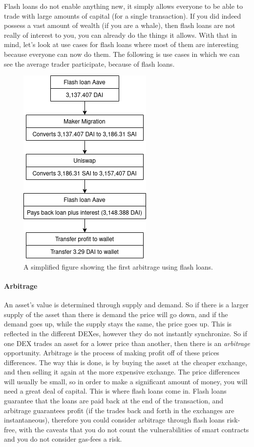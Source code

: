 Flash loans do not enable anything new, it simply allows everyone to be able
to trade with large amounts of capital (for a single transaction). If you did
indeed possess a vast amount of wealth (if you are a whale), then flash loans
are not really of interest to you, you can already do the things it allows. With
that in mind, let's look at use cases for flash loans where most of them are
interesting because everyone can now do them. The following is use cases in
which we can see the average trader participate, because of flash
loans\cite{attack}.

\begin{figure}
  \centering
  \includegraphics[width=.2\textwidth]{assests/Flash-loans-18-jan}
  \caption{A simplified figure showing the first arbitrage using flash loans.}
  \label{fig:firstArb}
\end{figure}
\paragraph{Arbitrage}
An asset's value is determined through supply and demand. So if there is a larger
supply of the asset than there is demand the price will go down, and if the
demand goes up, while the supply stays the same, the price goes up. This is
reflected in the different DEXes, however they do not instantly synchronize. So
if one DEX trades an asset for a lower price than another, then there is
an \textit{arbitrage} opportunity. Arbitrage is the process of making profit off
of these prices differences. The way this is done, is by buying the asset at the
cheaper exchange, and then selling it again at the more expensive exchange. The
price differences will usually be small, so in order to make a significant
amount of money, you will need a great deal of capital. This is where flash
loans come in. Flash loans guarantee that the loans are paid back at the end of
the transaction, and arbitrage guarantees profit (if the trades back and forth
in the exchanges are instantaneous), therefore you could consider arbitrage
through flash loans risk-free, with the caveats that you do not count the
vulnerabilities of smart contracts and you do not consider gas-fees a risk.\\

